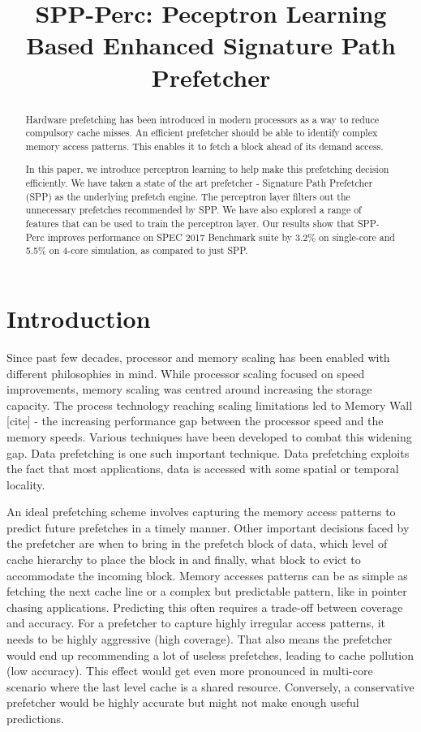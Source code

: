 \documentclass{sig-alternate}
\title{SPP-Perc: Peceptron Learning Based Enhanced Signature Path Prefetcher}
\author{}
\begin{document}
\maketitle
\thispagestyle{firstpage}
\pagestyle{plain}

\begin{abstract}

Hardware prefetching has been introduced in modern processors as a way to reduce compulsory cache misses. 
An efficient prefetcher should be able to identify complex memory access patterns. 
This enables it to fetch a block ahead of its demand access. 

In this paper, we introduce perceptron learning to help make this prefetching decision efficiently. 
We have taken a state of the art prefetcher - Signature Path Prefetcher (SPP) as the underlying prefetch engine. 
The perceptron layer filters out the unnecessary prefetches recommended by SPP. 
We have also explored a range of features that can be used to train the perceptron layer. 
Our results show that SPP-Perc improves performance on SPEC 2017 Benchmark suite by 3.2\% on single-core and 5.5\% on 4-core simulation, as compared to just SPP.

\end{abstract}

\section{Introduction}
Since past few decades, processor and memory scaling has been enabled with different philosophies in mind. 
While processor scaling focused on speed improvements, memory scaling was centred around increasing the storage capacity. 
The process technology reaching scaling limitations led to Memory Wall [cite] - the increasing performance gap between the processor speed and the memory speeds. 
Various techniques have been developed to combat this widening gap. 
Data prefetching is one such important technique. 
Data prefetching exploits the fact that most applications, data is accessed with some spatial or temporal locality.

An ideal prefetching scheme involves capturing the memory access patterns to predict future prefetches in a timely manner. 
Other important decisions faced by the prefetcher are when to bring in the prefetch block of data, which level of cache hierarchy to place the block in and finally, what block to evict to accommodate the incoming block. 
Memory accesses patterns can be as simple as fetching the next cache line or a complex but predictable pattern, like in pointer chasing applications. 
Predicting this often requires a trade-off between coverage and accuracy. 
For a prefetcher to capture highly irregular access patterns, it needs to be highly aggressive (high coverage). 
That also means the prefetcher would end up recommending a lot of useless prefetches, leading to cache pollution (low accuracy). 
This effect would get even more pronounced in multi-core scenario where the last level cache is a shared resource. 
Conversely, a conservative prefetcher would be highly accurate but might not make enough useful predictions.
\end{document}
